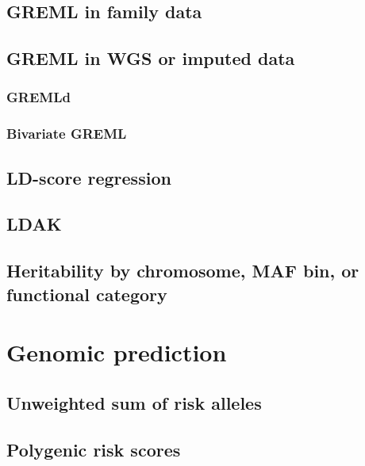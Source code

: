 \documentclass[]{book}
\theoremstyle{definition}
\theoremstyle{definition}
\theoremstyle{definition}
\theoremstyle{remark}
\begin{document}
\section{GREML in family data}\label{greml-in-family-data}

\section{GREML in WGS or imputed
data}\label{greml-in-wgs-or-imputed-data}

\subsection{GREMLd}\label{gremld}

\subsection{Bivariate GREML}\label{bivariate-greml}

\section{LD-score regression}\label{ld-score-regression}

\section{LDAK}\label{ldak}

\section{Heritability by chromosome, MAF bin, or functional
category}\label{heritability-by-chromosome-maf-bin-or-functional-category}

\chapter{Genomic prediction}\label{genomic-prediction}

\section{Unweighted sum of risk
alleles}\label{unweighted-sum-of-risk-alleles}

\section{Polygenic risk scores}\label{polygenic-risk-scores}
\end{document}
